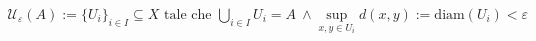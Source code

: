 \documentclass[preview]{standalone}
\begin{document}
\begin{align*}
\mathcal{U}_{\varepsilon}(A) := \{U_i\}_{i \in I} \subseteq X \text{ tale che } \bigcup_{i \in I} U_i = A \ \land \sup_{x,y \in U_i} d(x,y) := \text{diam}(U_i) < \varepsilon
\end{align*}
\end{document}
